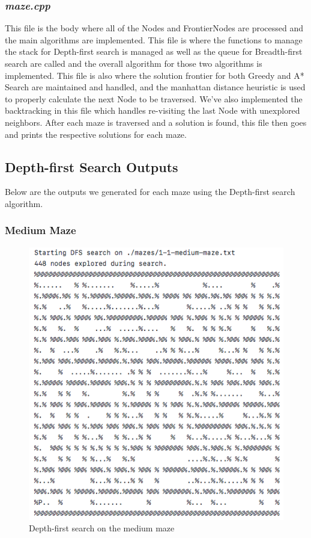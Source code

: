 \documentclass[titlepage]{article}
\begin{document}
\subsubsection{\textit{maze.cpp}}
This file is the body where all of the Nodes and FrontierNodes are processed and the main algorithms are implemented. This file is where the functions to manage the stack for Depth-first search is managed as well as the queue for Breadth-first search are called and the overall algorithm for those two algorithms is implemented. This file is also where the solution frontier for both Greedy and A* Search are maintained and handled, and the manhattan distance heuristic is used to properly calculate the next Node to be traversed. We've also implemented the backtracking in this file which handles re-visiting the last Node with unexplored neighbors. After each maze is traversed and a solution is found, this file then goes and prints the respective solutions for each maze.

\newpage

\subsection{Depth-first Search Outputs}
Below are the outputs we generated for each maze using the Depth-first search algorithm. 
\subsubsection{Medium Maze}
\begin{figure}[h!]
\includegraphics[width=\linewidth]{dfsmedium.png}
\caption{Depth-first search on the medium maze}
\label{fig:DFSmedium}
\end{figure}
\end{document}
